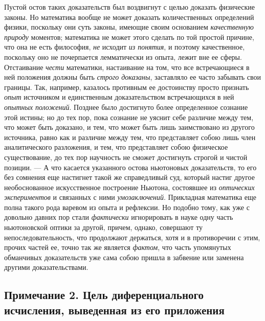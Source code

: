 {Пустой остов таких доказательств был воздвигнут с целью доказать физические
законы. Но математика вообще не может доказать количественных определений
физики, поскольку они суть законы, имеющие своим основанием
{\em качественную природу} моментов; математика не
может этого сделать по той простой причине, что она не есть философия,
{\em не} исходит {\em из понятия},
и поэтому качественное, поскольку оно не почерпается лемматически из опыта,
лежит вне ее сферы. Отстаивание {\em чести} математики,
настаивание на том, что все встречающиеся в ней положения должны быть
{\em строго доказаны}, заставляло ее часто забывать
свои границы. Так, например, казалось противным ее достоинству просто
признать {\em опыт} источником и единственным
доказательством встречающихся в ней {\em опытных
}{\em положений}. Позднее было достигнуто более
определенное сознание этой истины; но до тех пор, пока сознание не уяснит
себе различие между тем, что может быть доказано, и тем, что может быть
лишь заимствовано из другого источника, равно как и различие между тем, что
представляет собою лишь член аналитического разложения, и тем, что
представляет собою физическое существование, до тех пор научность не сможет
достигнуть строгой и чистой позиции. — А что касается указанного остова
ньютоновых доказательств, то его без сомнения еще настигнет такой же
справедливый суд, который настиг другое необоснованное искусственное
построение Ньютона, состоявшее из {\em оптических
экспериментов} и связанных с ними {\em умозаключений}.
Прикладная математика еще полна такого рода варевом из опыта и рефлексии.
Но подобно тому, как уже с довольно давних пор стали
{\em фактически} игнорировать в науке одну часть
ньютоновской оптики за другой, причем, однако, совершают ту
непоследовательность, что продолжают держаться, хотя и в противоречии с
этим, прочих частей ее, точно так же является
{\em фактом}, что часть упомянутых обманчивых
доказательств уже сама собою пришла в забвение или заменена другими
доказательствами.

\subsection*{Примечание 2. Цель диференциального исчисления, выведенная
из его приложения}

}
